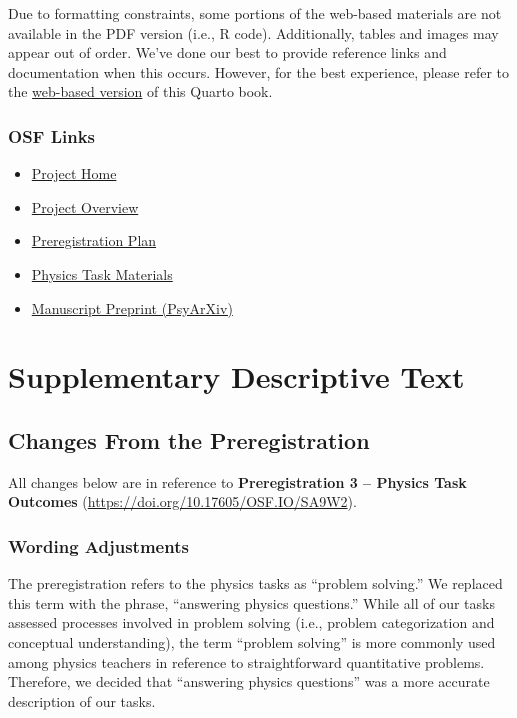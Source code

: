 \documentclass[
  letterpaper,
  DIV=11,
  numbers=noendperiod]{scrreprt}
\providecommand{\tightlist}{%
  \setlength{\itemsep}{0pt}\setlength{\parskip}{0pt}}
\begin{document}

Due to formatting constraints, some portions of the web-based materials
are not available in the PDF version (i.e., R code). Additionally,
tables and images may appear out of order. We've done our best to
provide reference links and documentation when this occurs. However, for
the best experience, please refer to the
\href{https://apelakh.github.io/pelakh-et-al-2025-supplement/}{web-based
version} of this Quarto book.

\section*{OSF Links}\label{osf-links}


\begin{itemize}
\tightlist
\item
  \href{https://doi.org/10.17605/OSF.IO/WV6XT}{Project Home}
\item
  \href{https://doi.org/10.17605/OSF.IO/7RXVC}{Project Overview}
\item
  \href{https://doi.org/10.17605/OSF.IO/SA9W2}{Preregistration Plan}
\item
  \href{https://osf.io/fm8qx/}{Physics Task Materials}
\item
  \href{https://doi.org/10.31234/osf.io/sqpd5_v1}{Manuscript Preprint
  (PsyArXiv)}
\end{itemize}

\part{Supplementary Descriptive Text}

\chapter{Changes From the
Preregistration}\label{changes-from-the-preregistration}

All changes below are in reference to \textbf{Preregistration 3 --
Physics Task Outcomes} (\url{https://doi.org/10.17605/OSF.IO/SA9W2}).

\section{Wording Adjustments}\label{wording-adjustments}

The preregistration refers to the physics tasks as ``problem solving.''
We replaced this term with the phrase, ``answering physics questions.''
While all of our tasks assessed processes involved in problem solving
(i.e., problem categorization and conceptual understanding), the term
``problem solving'' is more commonly used among physics teachers in
reference to straightforward quantitative problems. Therefore, we
decided that ``answering physics questions'' was a more accurate
description of our tasks.
\end{document}
